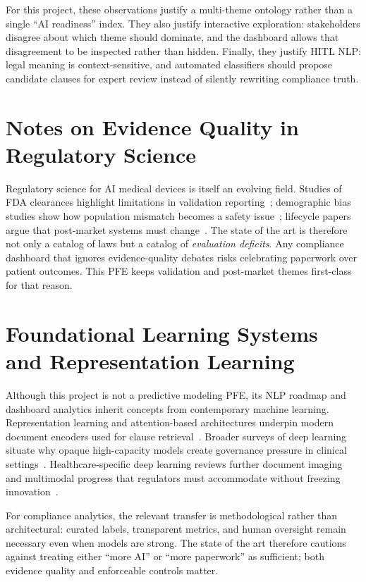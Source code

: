 For this project, these observations justify a multi-theme ontology rather than a single ``AI readiness'' index. They also justify interactive exploration: stakeholders disagree about which theme should dominate, and the dashboard allows that disagreement to be inspected rather than hidden. Finally, they justify HITL NLP: legal meaning is context-sensitive, and automated classifiers should propose candidate clauses for expert review instead of silently rewriting compliance truth.

\section{Notes on Evidence Quality in Regulatory Science}
\label{sec:evquality}

Regulatory science for AI medical devices is itself an evolving field. Studies of FDA clearances highlight limitations in validation reporting~\cite{wu2021}; demographic bias studies show how population mismatch becomes a safety issue~\cite{obermeyer2019,seyedkalantari2021}; lifecycle papers argue that post-market systems must change~\cite{hwang2019,babic2019}. The state of the art is therefore not only a catalog of laws but a catalog of \emph{evaluation deficits}. Any compliance dashboard that ignores evidence-quality debates risks celebrating paperwork over patient outcomes. This PFE keeps validation and post-market themes first-class for that reason.

\section{Foundational Learning Systems and Representation Learning}
\label{sec:mlfoundations}

Although this project is not a predictive modeling PFE, its NLP roadmap and dashboard analytics inherit concepts from contemporary machine learning. Representation learning and attention-based architectures underpin modern document encoders used for clause retrieval~\cite{vaswani2017}. Broader surveys of deep learning situate why opaque high-capacity models create governance pressure in clinical settings~\cite{lecun2015}. Healthcare-specific deep learning reviews further document imaging and multimodal progress that regulators must accommodate without freezing innovation~\cite{esteva2019,litjens2017}.

For compliance analytics, the relevant transfer is methodological rather than architectural: curated labels, transparent metrics, and human oversight remain necessary even when models are strong. The state of the art therefore cautions against treating either ``more AI'' or ``more paperwork'' as sufficient; both evidence quality and enforceable controls matter.

